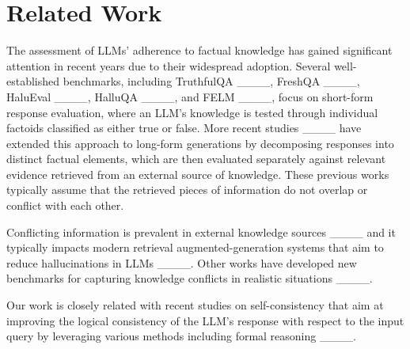 \section{Related Work}
\label{sec-related}

The assessment of LLMs' adherence to factual knowledge has gained significant attention in recent years due to their widespread adoption. Several well-established benchmarks, including TruthfulQA ____, FreshQA ____, HaluEval ____, HalluQA ____, and FELM ____, focus on short-form response evaluation, where an LLM’s knowledge is tested through individual factoids classified as either true or false. More recent studies ____ have extended this approach to long-form generations by decomposing responses into distinct factual elements, which are then evaluated separately against relevant evidence retrieved from an external source of knowledge. These previous works typically assume that the retrieved pieces of information do not overlap or conflict with each other. 

Conflicting information is prevalent in external knowledge sources ____ and it typically impacts modern retrieval augmented-generation systems that aim to reduce hallucinations in LLMs ____. Other works have developed new benchmarks for capturing knowledge conflicts in realistic situations ____. 

Our work is closely related with recent studies on self-consistency that aim at improving the logical consistency of the LLM's response with respect to the input query by leveraging various methods including formal reasoning
____.